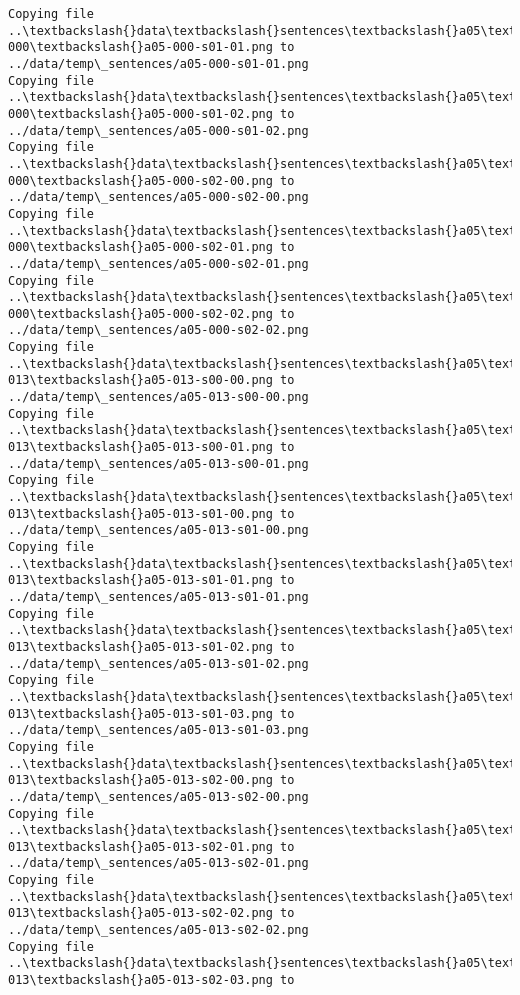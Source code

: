 \documentclass[11pt]{article}
\begin{document}
\begin{Verbatim}[commandchars=\\\{\}]
Copying file ..\textbackslash{}data\textbackslash{}sentences\textbackslash{}a05\textbackslash{}a05-000\textbackslash{}a05-000-s01-01.png to
../data/temp\_sentences/a05-000-s01-01.png
Copying file ..\textbackslash{}data\textbackslash{}sentences\textbackslash{}a05\textbackslash{}a05-000\textbackslash{}a05-000-s01-02.png to
../data/temp\_sentences/a05-000-s01-02.png
Copying file ..\textbackslash{}data\textbackslash{}sentences\textbackslash{}a05\textbackslash{}a05-000\textbackslash{}a05-000-s02-00.png to
../data/temp\_sentences/a05-000-s02-00.png
Copying file ..\textbackslash{}data\textbackslash{}sentences\textbackslash{}a05\textbackslash{}a05-000\textbackslash{}a05-000-s02-01.png to
../data/temp\_sentences/a05-000-s02-01.png
Copying file ..\textbackslash{}data\textbackslash{}sentences\textbackslash{}a05\textbackslash{}a05-000\textbackslash{}a05-000-s02-02.png to
../data/temp\_sentences/a05-000-s02-02.png
Copying file ..\textbackslash{}data\textbackslash{}sentences\textbackslash{}a05\textbackslash{}a05-013\textbackslash{}a05-013-s00-00.png to
../data/temp\_sentences/a05-013-s00-00.png
Copying file ..\textbackslash{}data\textbackslash{}sentences\textbackslash{}a05\textbackslash{}a05-013\textbackslash{}a05-013-s00-01.png to
../data/temp\_sentences/a05-013-s00-01.png
Copying file ..\textbackslash{}data\textbackslash{}sentences\textbackslash{}a05\textbackslash{}a05-013\textbackslash{}a05-013-s01-00.png to
../data/temp\_sentences/a05-013-s01-00.png
Copying file ..\textbackslash{}data\textbackslash{}sentences\textbackslash{}a05\textbackslash{}a05-013\textbackslash{}a05-013-s01-01.png to
../data/temp\_sentences/a05-013-s01-01.png
Copying file ..\textbackslash{}data\textbackslash{}sentences\textbackslash{}a05\textbackslash{}a05-013\textbackslash{}a05-013-s01-02.png to
../data/temp\_sentences/a05-013-s01-02.png
Copying file ..\textbackslash{}data\textbackslash{}sentences\textbackslash{}a05\textbackslash{}a05-013\textbackslash{}a05-013-s01-03.png to
../data/temp\_sentences/a05-013-s01-03.png
Copying file ..\textbackslash{}data\textbackslash{}sentences\textbackslash{}a05\textbackslash{}a05-013\textbackslash{}a05-013-s02-00.png to
../data/temp\_sentences/a05-013-s02-00.png
Copying file ..\textbackslash{}data\textbackslash{}sentences\textbackslash{}a05\textbackslash{}a05-013\textbackslash{}a05-013-s02-01.png to
../data/temp\_sentences/a05-013-s02-01.png
Copying file ..\textbackslash{}data\textbackslash{}sentences\textbackslash{}a05\textbackslash{}a05-013\textbackslash{}a05-013-s02-02.png to
../data/temp\_sentences/a05-013-s02-02.png
Copying file ..\textbackslash{}data\textbackslash{}sentences\textbackslash{}a05\textbackslash{}a05-013\textbackslash{}a05-013-s02-03.png to

\end{Verbatim}
\end{document}
